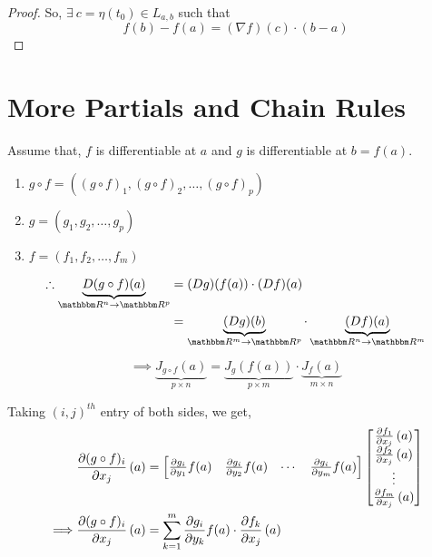\documentclass[../Analysis-3]{subfiles}
\begin{document}
\begin{proof}
    So, $\exists\ c = \eta(t_0) \in L_{a,b}$ such that \[ f(b) - f(a) = (\nabla f)(c)\cdot(b-a) \]
\end{proof}

\section{More Partials and Chain Rules}

Assume that, $f$ is differentiable at $a$ and $g$ is differentiable at $b = f(a)$.

\begin{notnBox}
    \begin{enumerate}
        \item $g \circ f = \left( (g \circ f)_1, (g \circ f)_2, \ldots, (g \circ f)_p \right)$
        \item $g = \left( g_1, g_2, \ldots, g_p \right)$
        \item $f = \left( f_1, f_2, \ldots, f_m \right)$
    \end{enumerate}
\end{notnBox}

\begin{align*}
    \therefore    \underbrace{D(g \circ f)(a)}_{\R^n \to \R^p} & = (Dg)(f(a))\cdot (Df)(a)                                                        \\
                                                               & = \underbrace{(Dg)(b)}_{\R^m \to \R^p}\cdot \underbrace{(Df)(a)}_{\R^n \to \R^m}
\end{align*}

\[\implies \underbrace{J_{g \circ f}(a)}_{p \times n} = \underbrace{J_{g}(f(a))}_{p \times m}\cdot \underbrace{J_{f}(a)}_{m \times n} \]

Taking $(i,j)^{th}$ entry of both sides, we get,
\begin{align*}
             & \pdv{(g\circ f)_{i}}{x_j}\left( a \right) = \begin{bmatrix}
                                                               \pdv{g_i}{y_1}f(a) & \pdv{g_i}{y_2}f(a) & \cdots & \pdv{g_i}{y_m}f(a)
                                                           \end{bmatrix} \begin{bmatrix}
                                                                             \pdv{f_1}{x_j}\left( a \right) \\
                                                                             \pdv{f_2}{x_j}\left( a \right) \\
                                                                             \vdots                         \\
                                                                             \pdv{f_m}{x_j}\left( a \right)
                                                                         \end{bmatrix}  \\
    \implies & \pdv{(g\circ f)_{i}}{x_j}\left( a \right) = \sum_{k = 1}^{m} \pdv{g_i}{y_k}f(a)\cdot\pdv{f_k}{x_j}\left( a \right)
\end{align*}
\end{document}
